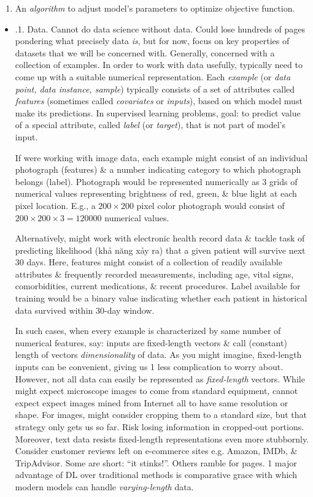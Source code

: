 \documentclass{article}
\begin{document}
\begin{itemize}
\begin{itemize}
\begin{enumerate}
			\item An {\it algorithm} to adjust model's parameters to optimize objective function.
		\end{enumerate}
		\begin{itemize}
			\item {.1. Data.} Cannot do data science without data. Could lose hundreds of pages pondering what precisely data {\it is}, but for now, focus on key properties of datasets that we will be concerned with. Generally, concerned with a collection of examples. In order to work with data usefully, typically need to come up with a suitable numerical representation. Each {\it example} (or {\it data point, data instance, sample}) typically consists of a set of attributes called {\it features} (sometimes called {\it covariates} or {\it inputs}), based on which model must make its predictions. In supervised learning problems, goal: to predict value of a special attribute, called {\it label} (or {\it target}), that is not part of model's input.
			
			If were working with image data, each example might consist of an individual photograph (features) \& a number indicating category to which photograph belongs (label). Photograph would be represented numerically as 3 grids of numerical values representing brightness of red, green, \& blue light at each pixel location. E.g., a $200\times200$ pixel color photograph would consist of $200\times200\times3 = 120000$ numerical values.
			
			Alternatively, might work with electronic health record data \& tackle task of predicting likelihood (khả năng xảy ra) that a given patient will survive next 30 days. Here, features might consist of a collection of readily available attributes \& frequently recorded measurements, including age, vital signs, comorbidities, current medications, \& recent procedures. Label available for training would be a binary value indicating whether each patient in historical data survived within 30-day window.
			
			In such cases, when every example is characterized by same number of numerical features, say: inputs are fixed-length vectors \& call (constant) length of vectors {\it dimensionality} of data. As you might imagine, fixed-length inputs can be convenient, giving us 1 less complication to worry about. However, not all data can easily be represented as {\it fixed-length} vectors. While might expect microscope images to come from standard equipment, cannot expect expect images mined from Internet all to have same resolution or shape. For images, might consider cropping them to a standard size, but that strategy only gets us so far. Risk losing information in cropped-out portions. Moreover, text data resists fixed-length representations even more stubbornly. Consider customer reviews left on e-commerce sites e.g. Amazon, IMDb, \& TripAdvisor. Some are short: ``it stinks!''. Others ramble for pages. 1 major advantage of DL over traditional methods is comparative grace with which modern models can handle {\it varying-length} data.
			

\end{itemize}
\end{itemize}
\end{itemize}
\end{document}
